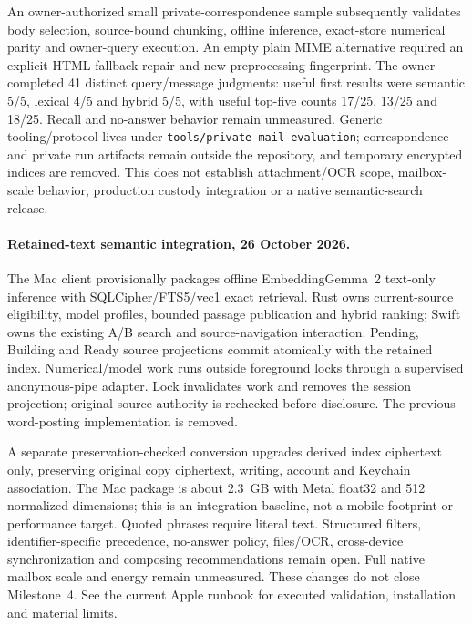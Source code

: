 \documentclass[11pt]{article}
\begin{document}
An owner-authorized small private-correspondence sample subsequently validates
body selection, source-bound chunking, offline inference, exact-store numerical
parity and owner-query execution. An empty plain MIME alternative required an
explicit HTML-fallback repair and new preprocessing fingerprint. The owner completed
41 distinct query/message judgments: useful first results were semantic 5/5,
lexical 4/5 and hybrid 5/5, with useful top-five counts 17/25, 13/25 and 18/25.
Recall and no-answer behavior remain unmeasured. Generic tooling/protocol lives under
\texttt{tools/private-mail-evaluation}; correspondence and private run artifacts
remain outside the repository, and temporary encrypted indices are removed.
This does not establish attachment/OCR scope, mailbox-scale behavior, production
custody integration or a native semantic-search release.

\paragraph{Retained-text semantic integration, 26 October 2026.}
The Mac client provisionally packages offline EmbeddingGemma~2 text-only inference
with SQLCipher/FTS5/vec1 exact retrieval. Rust owns current-source eligibility,
model profiles, bounded passage publication and hybrid ranking; Swift owns the
existing A/B search and source-navigation interaction. Pending, Building and Ready
source projections commit atomically with the retained index. Numerical/model work
runs outside foreground locks through a supervised anonymous-pipe adapter. Lock
invalidates work and removes the session projection; original source authority is
rechecked before disclosure. The previous word-posting implementation is removed.

A separate preservation-checked conversion upgrades derived index ciphertext only,
preserving original copy ciphertext, writing, account and Keychain association.
The Mac package is about 2.3~GB with Metal float32 and 512 normalized dimensions;
this is an integration baseline, not a mobile footprint or performance target.
Quoted phrases require literal text. Structured filters, identifier-specific
precedence, no-answer policy, files/OCR, cross-device synchronization and composing
recommendations remain open. Full native mailbox scale and energy remain unmeasured.
These changes do not close Milestone~4. See the current Apple runbook for executed
validation, installation and material limits.
\end{document}
